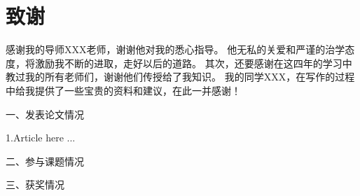 \documentclass{QHUMaster}
\begin{document}
\chapter{致\quad 谢}

感谢我的导师XXX老师，谢谢他对我的悉心指导。
他无私的关爱和严谨的治学态度，将激励我不断的进取，走好以后的道路。
其次，还要感谢在这四年的学习中教过我的所有老师们，谢谢他们传授给了我知识。
我的同学XXX，在写作的过程中给我提供了一些宝贵的资料和建议，在此一并感谢！

\Achievements
一、发表论文情况

1.Article here ...

\blank

二、参与课题情况

三、获奖情况
\end{document}
